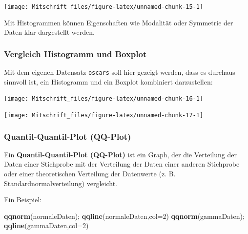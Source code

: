 \documentclass[
]{article}
\newenvironment{Shaded}{\begin{snugshade}}{\end{snugshade}}
\newcommand{\AttributeTok}[1]{\textcolor[rgb]{0.13,0.29,0.53}{#1}}
\newcommand{\DecValTok}[1]{\textcolor[rgb]{0.00,0.00,0.81}{#1}}
\newcommand{\FunctionTok}[1]{\textcolor[rgb]{0.13,0.29,0.53}{\textbf{#1}}}
\newcommand{\NormalTok}[1]{#1}
\begin{document}
\begin{center}\texttt{[image: Mitschrift\_files/figure-latex/unnamed-chunk-15-1]} \end{center}

Mit Histogrammen können Eigenschaften wie Modalität oder Symmetrie der
Daten klar dargestellt werden. \endtcolorbox

\hypertarget{vergleich-histogramm-und-boxplot}{%
\subsubsection{Vergleich Histogramm und
Boxplot}\label{vergleich-histogramm-und-boxplot}}

Mit dem eigenen Datensatz \texttt{oscars} soll hier gezeigt werden, dass
es durchaus sinnvoll ist, ein Histogramm und ein Boxplot kombiniert
darzustellen:

\begin{center}\texttt{[image: Mitschrift\_files/figure-latex/unnamed-chunk-16-1]} \end{center}

\begin{center}\texttt{[image: Mitschrift\_files/figure-latex/unnamed-chunk-17-1]} \end{center}

\hypertarget{quantil-quantil-plot-qq-plot}{%
\subsubsection{Quantil-Quantil-Plot
(QQ-Plot)}\label{quantil-quantil-plot-qq-plot}}

\tcolorbox

Ein \textbf{Quantil-Quantil-Plot (QQ-Plot)} ist ein Graph, der die
Verteilung der Daten einer Stichprobe mit der Verteilung der Daten einer
anderen Stichprobe oder einer theoretischen Verteilung der Datenwerte
(z. B. Standardnormalverteilung) vergleicht. \endtcolorbox

Ein Beispiel:

\begin{Shaded}
\begin{Highlighting}[]
\FunctionTok{qqnorm}\NormalTok{(normaleDaten); }\FunctionTok{qqline}\NormalTok{(normaleDaten,}\AttributeTok{col=}\DecValTok{2}\NormalTok{)}
\FunctionTok{qqnorm}\NormalTok{(gammaDaten); }\FunctionTok{qqline}\NormalTok{(gammaDaten,}\AttributeTok{col=}\DecValTok{2}\NormalTok{)}
\end{Highlighting}
\end{Shaded}
\end{document}
